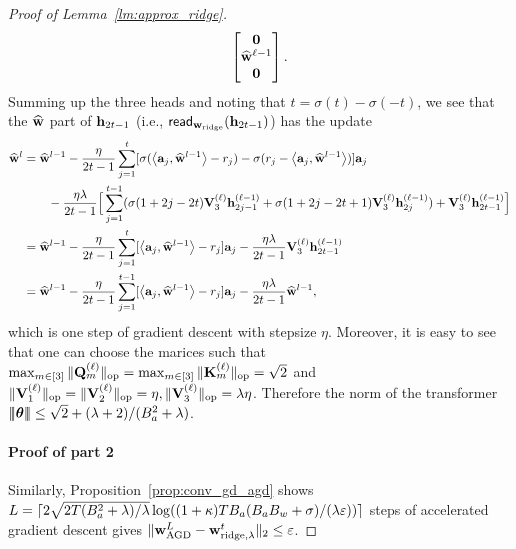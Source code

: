 \begin{proof}[Proof of Lemma~\ref{lm:approx_ridge}]
\begin{align*}
\begin{bmatrix}
        {\mathbf 0}\\ \widehat{{\mathbf w}}^{\ell-1}\\ {\mathbf 0}
    \end{bmatrix}.
\end{align*}
Summing up the three heads and noting that $t=\sigma(t)-\sigma(-t)$, we see that the $\widehat{{\mathbf w}}$ part of ${\mathbf h}_{2t-1}$ (i.e., ${\sf read}_{{\mathbf w}_{\rm ridge}}({\mathbf h}_{2t-1})$) has the update
\begin{align*}
    \widehat{{\mathbf w}}^{l}
    &=\widehat{{\mathbf w}}^{l-1}-\frac{\eta}{2t-1}\sum_{j=1}^t[\sigma(\left\langle{\mathbf a}_j,\widehat{{\mathbf w}}^{l-1}\right\rangle-r_j)-\sigma(r_j-\left\langle{\mathbf a}_j,\widehat{{\mathbf w}}^{l-1}\right\rangle)]{\mathbf a}_j\\&
    \qquad
    -\frac{\eta\lambda}{2t-1}\Big[\sum_{j=1}^{t-1}(\sigma(1+2j-2t){\mathbf V}_3^{(\ell)}{\mathbf h}^{(\ell-1)}_{2j-1}+\sigma(1+2j-2t+1){\mathbf V}_3^{(\ell)}{\mathbf h}^{(\ell-1)}_{2j})+
   {\mathbf V}_3^{(\ell)}{\mathbf h}^{(\ell-1)}_{2t-1}\Big]\\
     &=\widehat{{\mathbf w}}^{l-1}-\frac{\eta}{2t-1}\sum_{j=1}^t[\left\langle{\mathbf a}_j,\widehat{{\mathbf w}}^{l-1}\right\rangle-r_j]{\mathbf a}_j-\frac{\eta\lambda}{2t-1}{\mathbf V}_3^{(\ell)}{\mathbf h}^{(\ell-1)}_{2t-1}\\
     &=\widehat{{\mathbf w}}^{l-1}-\frac{\eta}{2t-1}\sum_{j=1}^{t-1}[\left\langle{\mathbf a}_j,\widehat{{\mathbf w}}^{l-1}\right\rangle-r_j]{\mathbf a}_j-\frac{\eta\lambda}{2t-1}\widehat{{\mathbf w}}^{l-1},
\end{align*}
which is one step of gradient descent with stepsize $\eta$.  Moreover, it is easy to see that one can choose the marices such that $\max_{m\in[3]}\|{{\mathbf Q}^{(\ell)}_m}\|_{\mathrm{op}}=\max_{m\in[3]}\|{{\mathbf K}^{(\ell)}_m}\|_{\mathrm{op}}=\sqrt{2}$ and $\|{{\mathbf V}^{(\ell)}_1}\|_{\mathrm{op}}=\|{{\mathbf V}^{(\ell)}_2}\|_{\mathrm{op}}=\eta,\|{{\mathbf V}^{(\ell)}_3}\|_{\mathrm{op}}= \lambda\eta$. Therefore the norm of the transformer ${\left|\!\left|\!\left|{{\boldsymbol \theta}}\right|\!\right|\!\right|}\leq \sqrt{2}+(\lambda+2)/(B_a^2+\lambda)$.


\paragraph{Proof of part 2}
Similarly,  Proposition~\ref{prop:conv_gd_agd} shows $L=\lceil2\sqrt{2T(B_a^2+\lambda)/\lambda}\log((1+\kappa){TB_a(B_aB_w+\sigma)}/({\lambda}\varepsilon))\rceil$ steps of accelerated gradient descent gives  $\|{\mathbf w}^L_{{\mathrm{AGD}}}-{\mathbf w}^t_{{\rm ridge},\lambda}\|_2\leq\varepsilon$. 


\end{proof}

